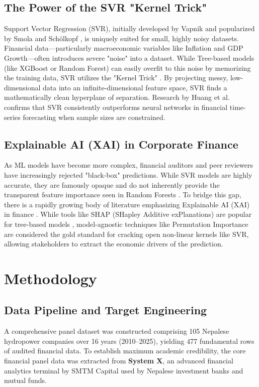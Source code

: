 \documentclass[11pt,a4paper]{article}
\begin{document}
\subsection{The Power of the SVR "Kernel Trick"}
Support Vector Regression (SVR), initially developed by Vapnik \cite{vapnik1995} and popularized by Smola and Schölkopf \cite{smola2004}, is uniquely suited for small, highly noisy datasets. Financial data---particularly macroeconomic variables like Inflation and GDP Growth---often introduces severe "noise" into a dataset. While Tree-based models (like XGBoost or Random Forest) can easily overfit to this noise by memorizing the training data, SVR utilizes the "Kernel Trick" \cite{tay2001, cao2003}. By projecting messy, low-dimensional data into an infinite-dimensional feature space, SVR finds a mathematically clean hyperplane of separation. Research by Huang et al. \cite{huang2005} confirms that SVR consistently outperforms neural networks in financial time-series forecasting when sample sizes are constrained.

\subsection{Explainable AI (XAI) in Corporate Finance}
As ML models have become more complex, financial auditors and peer reviewers have increasingly rejected "black-box" predictions. While SVR models are highly accurate, they are famously opaque and do not inherently provide the transparent feature importance seen in Random Forests \cite{breiman2001}. To bridge this gap, there is a rapidly growing body of literature emphasizing Explainable AI (XAI) in finance \cite{bracke2019}. While tools like SHAP (SHapley Additive exPlanations) are popular for tree-based models \cite{lundberg2017}, model-agnostic techniques like Permutation Importance \cite{fisher2019} are considered the gold standard for cracking open non-linear kernels like SVR, allowing stakeholders to extract the economic drivers of the prediction.

\section{Methodology}

\subsection{Data Pipeline and Target Engineering}
A comprehensive panel dataset was constructed comprising 105 Nepalese hydropower companies over 16 years (2010--2025), yielding 477 fundamental rows of audited financial data. To establish maximum academic credibility, the core financial panel data was extracted from \textbf{System X}, an advanced financial analytics terminal by SMTM Capital used by Nepalese investment banks and mutual funds.
\end{document}
